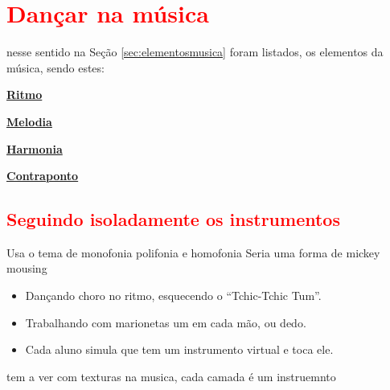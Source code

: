 

\section{\textcolor{red}{Dançar na música}}
\label{subsec:dancamusica}

nesse sentido na Seção \ref{sec:elementosmusica} foram listados,
os elementos da música, sendo estes:
\begin{inparaitem}
\item \hyperref[sec:pos:Ritmo]{\textbf{Ritmo}}
\item \hyperref[sec:pos:Melodia]{\textbf{Melodia}}
\item \hyperref[sec:pos:Harmonia]{\textbf{Harmonia}}
\item \hyperref[sec:pos:Contraponto]{\textbf{Contraponto}}
\end{inparaitem}



\subsection{\textcolor{red}{Seguindo isoladamente os instrumentos}}
\label{sec:seguindoinstrumentos}
Usa o tema de monofonia polifonia e homofonia
Seria uma forma de mickey mousing
\begin{itemize}
\item Dançando choro no ritmo, esquecendo o ``Tchic-Tchic Tum''.
\item Trabalhando com marionetas um em cada mão, ou dedo.
\item Cada aluno simula que tem um instrumento virtual e toca ele.
\end{itemize}

tem a ver com texturas na musica, cada camada é um instruemnto


